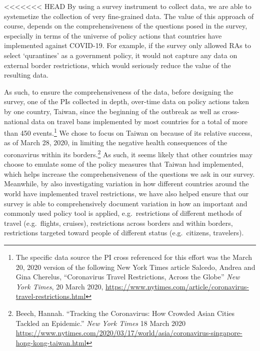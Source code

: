 \documentclass[]{article}
\let\rmarkdownfootnote\footnote%
\def\footnote{\protect\rmarkdownfootnote}
\begin{document}
<<<<<<< HEAD
By using a survey instrument to collect data, we are able to systemetize the collection of very fine-grained data. The value of this approach of course, depends on the comprehensiveness of the questions posed in the survey, especially in terms of the universe of policy actions that countries have implemented against COVID-19. For example, if the survey only allowed RAs to select `qurantines' as a government policy, it would not capture any data on external border restrictions, which would seriously reduce the value of the resulting data.

As such, to ensure the comprehensiveness of the data, before designing the survey, one of the PIs collected in depth, over-time data on policy actions taken by one country, Taiwan, since the beginning of the outbreak as well as cross-national data on travel bans implemented by most countries for a total of more than 450 events.\footnote{The specific data source the PI cross referenced for this effort was the March 20, 2020 version of the following New York Times article Salcedo, Andrea and Gina Cherelus, ``Coronavirus Travel Restrictions, Across the Globe'' \emph{New York Times}, 20 March 2020, \url{https://www.nytimes.com/article/coronavirus-travel-restrictions.html}} We chose to focus on Taiwan on because of its relative success, as of March 28, 2020, in limiting the negative health consequences of the coronavirus within its borders.\footnote{Beech, Hannah. ``Tracking the Coronavirus: How Crowded Asian Cities Tackled an Epidemic.'' \emph{New York Times} 18 March 2020 \url{https://www.nytimes.com/2020/03/17/world/asia/coronavirus-singapore-hong-kong-taiwan.html}} As such, it seems likely that other countries may choose to emulate some of the policy measures that Taiwan had implemented, which helps increase the comprehensiveness of the questions we ask in our survey. Meanwhile, by also investigating variation in how different countries around the world have implemented travel restrictions, we have also helped ensure that our survey is able to comprehensively document variation in how an important and commonly used policy tool is applied, e.g.~restrictions of different methods of travel (e.g.~flights, cruises), restrictions across borders and within borders, restrictions targeted toward people of different status (e.g.~citizens, travelers).
\end{document}
